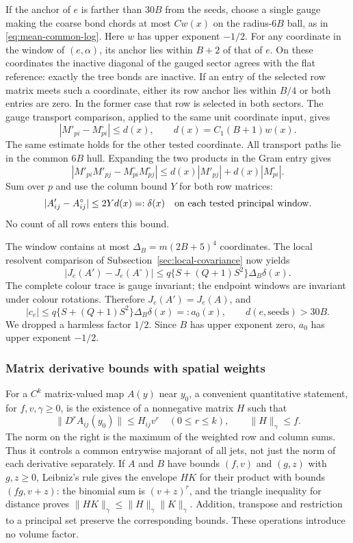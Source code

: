 If the anchor of $e$ is farther than $30B$ from the seeds, choose a
single gauge making the coarse bond chords at most $Cw(x)$ on the
radius-$6B$ ball, as in \eqref{eq:mean-common-log}. Here $w$ has
upper exponent $-1/2$. For any coordinate in the window of
$(e,\alpha)$, its anchor lies within $B+2$ of that of $e$.
On these coordinates the inactive diagonal of the gauged sector
agrees with the flat reference: exactly the tree bonds are inactive.
If an entry of the selected row matrix meets such a coordinate,
either its row anchor lies within $B/4$ or both entries are zero.
In the former case that row is selected in both sectors. The gauge
transport comparison, applied to the same unit coordinate input,
gives
\[
 |M'_{pi}-M^\circ_{pi}|\le d(x),\qquad
 d(x)=C_1(B+1)w(x).
\]
The same estimate holds for the other tested coordinate. All transport
paths lie in the common $6B$ hull. Expanding the two products in the
Gram entry gives
\[
 |M'_{pi}M'_{pj}-M^\circ_{pi}M^\circ_{pj}|
 \le d(x)|M'_{pj}|+d(x)|M^\circ_{pi}|.
\]
Sum over $p$ and use the column bound $Y$ for both row matrices:
\begin{equation}\label{eq:normalization-plate-near}
 |A'_{ij}-A^\circ_{ij}|\le2Yd(x)=:\delta(x)
 \quad\hbox{on each tested principal window}.
\end{equation}
No count of all rows enters this bound.

The window contains at most $\Delta_B=m(2B+5)^4$ coordinates.
The local resolvent comparison of
Subsection~\ref{sec:local-covariance} now yields
\[
 |J_e(A')-J_e(A^\circ)|
 \le q\{S+(Q+1)S^2\}\Delta_B\delta(x).
\]
The complete colour trace is gauge invariant; the endpoint windows
are invariant under colour rotations. Therefore $J_e(A')=J_e(A)$,
and
\begin{equation}\label{eq:normalization-remote}
 |c_e|\le q\{S+(Q+1)S^2\}\Delta_B\delta(x)
       =:a_0(x),\qquad d(e,\text{seeds})>30B.
\end{equation}
We dropped a harmless factor $1/2$. Since $B$ has upper exponent
zero, $a_0$ has upper exponent $-1/2$.

\subsubsection{Matrix derivative bounds with spatial weights}
For a $C^k$ matrix-valued map $A(y)$ near $y_0$, a convenient
quantitative statement, for $f,v,\gamma\ge0$, is the existence of a nonnegative matrix $H$
such that
\begin{equation}\label{eq:matrix-jet-envelope}
 \|D^r A_{ij}(y_0)\|\le H_{ij}v^r\quad(0\le r\le k),
 \qquad \|H\|_\gamma\le f.
\end{equation}
The norm on the right is the maximum of the weighted row and column
sums. Thus it controls a common entrywise majorant of all jets, not
just the norm of each derivative separately. If $A$ and $B$ have
bounds $(f,v)$ and $(g,z)$ with $g,z\ge0$, Leibniz's rule gives the envelope $HK$
for their product with bounds $(fg,v+z)$: the binomial sum is
$(v+z)^r$, and the triangle inequality for distance proves
$\|HK\|_\gamma\le\|H\|_\gamma\|K\|_\gamma$.
Addition, transpose and restriction to a principal set preserve the
corresponding bounds. These operations introduce no volume factor.


